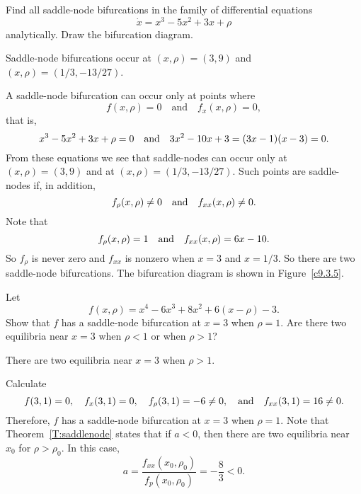 \documentclass{ximera}
\begin{document}
\begin{exercise} \label{c9.3.5}
Find all saddle-node bifurcations in the 
family of differential equations
\begin{equation}
\dot{x} = x^3 -5x^2 + 3x + \rho
\end{equation}
analytically.  Draw the bifurcation diagram.

\begin{solution}

\ans Saddle-node bifurcations occur at $(x,\rho)=(3,9)$ and 
$(x,\rho)=(1/3,-13/27)$.

\soln A saddle-node bifurcation can occur only at points where
\[ 
f(x,\rho)=0 \quad \mbox{and}\quad f_x(x,\rho)=0,
\]
that is, 
\[
x^3 -5x^2 + 3x + \rho = 0 \quad\mbox{and}\quad 3x^2 -10x +3 = (3x-1)(x-3)=0.
\]
From these equations we see that saddle-nodes can occur only at 
$(x,\rho)=(3,9)$ and at $(x,\rho)=(1/3,-13/27)$. Such points are saddle-nodes 
if, in addition, 
\[
f_\rho(x,\rho)\neq 0 \quad\mbox{and}\quad  f_{xx}(x,\rho)\neq 0.
\]
Note that
\[
f_\rho(x,\rho) = 1  \quad\mbox{and}\quad  f_{xx}(x,\rho) = 6x - 10.
\]
So $f_\rho$ is never zero and $f_{xx}$ is nonzero when $x=3$ and $x=1/3$.
So there are two saddle-node bifurcations.  The 
bifurcation diagram is shown in Figure~\ref{c9.3.5}.
\begin{figure}[htb]
     \centerline{%
     }
\end{figure}




\end{solution}
\end{exercise}

\begin{exercise} \label{c9.3.2}
Let 
\[
f(x,\rho) = x^4 - 6x^3 +8x^2 + 6(x-\rho) - 3.
\]
Show that $f$ has a saddle-node bifurcation at $x=3$ when $\rho=1$. 
Are there two equilibria near $x=3$ when $\rho<1$ or when $\rho>1$?

\begin{solution}

\ans There are two equilibria near $x = 3$ when $\rho > 1$.

\soln Calculate
\[
f(3,1) = 0, \quad
f_x(3,1) = 0, \quad
f_\rho(3,1) = -6 \neq 0, \quad\mbox{and}\quad
f_{xx}(3,1) = 16 \neq 0.
\]
Therefore, $f$ has a saddle-node bifurcation at $x = 3$ when $\rho =
1$.  Note that Theorem~\ref{T:saddlenode} states
that if $a < 0$, then there are two equilibria near $x_0$ for $\rho >
\rho_0$.  In this case,
\[
a = \frac{f_{xx}(x_0,\rho_0)}{f_p(x_0,\rho_0)} = -\frac{8}{3} < 0.
\]

\end{solution}
\end{exercise}
\end{document}

